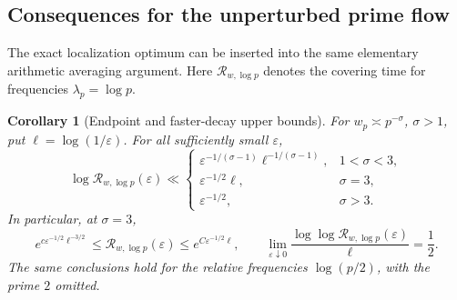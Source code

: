 \documentclass[11pt,letterpaper]{article}
\newtheorem{corollary}[theorem]{Corollary}
\theoremstyle{definition}
\theoremstyle{remark}
\newcommand{\1}{\mathbf 1}
\begin{document}
\subsection{Consequences for the unperturbed prime flow}

The exact localization optimum can be inserted into the same elementary
arithmetic averaging argument. Here $\mathcal R_{w,\log p}$ denotes the
covering time for frequencies $\lambda_p=\log p$.

\begin{corollary}[Endpoint and faster-decay upper bounds]
\label{p02:cor:barrier-recurrence}
For $w_p\asymp p^{-\sigma}$, $\sigma>1$, put
$\ell=\log(1/\varepsilon)$. For all sufficiently small $\varepsilon$,
\begin{equation}\label{p02:eq:barrier-Rupper}
 \log\mathcal R_{w,\log p}(\varepsilon)\ll
 \begin{cases}
 \varepsilon^{-1/(\sigma-1)}\ell^{-1/(\sigma-1)},&1<\sigma<3,\\
 \varepsilon^{-1/2}\ell,&\sigma=3,\\
 \varepsilon^{-1/2},&\sigma>3.
 \end{cases}
\end{equation}
In particular, at $\sigma=3$,
\begin{equation}\label{p02:eq:barrier-endpoint}
 e^{c\varepsilon^{-1/2}\ell^{-3/2}}
 \le\mathcal R_{w,\log p}(\varepsilon)
 \le e^{C\varepsilon^{-1/2}\ell},\qquad
 \lim_{\varepsilon\downarrow0}
 \frac{\log\log\mathcal R_{w,\log p}(\varepsilon)}{\ell}
 =\frac12.
\end{equation}
The same conclusions hold for the relative frequencies $\log(p/2)$,
with the prime $2$ omitted.
\end{corollary}
\end{document}
